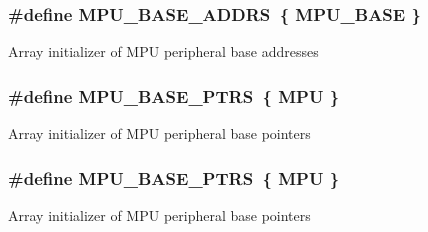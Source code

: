 \subsubsection[{\texorpdfstring{M\+P\+U\+\_\+\+B\+A\+S\+E\+\_\+\+A\+D\+D\+RS}{MPU_BASE_ADDRS}}]{\setlength{\rightskip}{0pt plus 5cm}\#define M\+P\+U\+\_\+\+B\+A\+S\+E\+\_\+\+A\+D\+D\+RS~\{ {\bf M\+P\+U\+\_\+\+B\+A\+SE} \}}\hypertarget{group__MPU__Peripheral__Access__Layer_ga05c682e671650e23a7103fb69e46ce86}{}\label{group__MPU__Peripheral__Access__Layer_ga05c682e671650e23a7103fb69e46ce86}
Array initializer of M\+PU peripheral base addresses 
\subsubsection[{\texorpdfstring{M\+P\+U\+\_\+\+B\+A\+S\+E\+\_\+\+P\+T\+RS}{MPU_BASE_PTRS}}]{\setlength{\rightskip}{0pt plus 5cm}\#define M\+P\+U\+\_\+\+B\+A\+S\+E\+\_\+\+P\+T\+RS~\{ {\bf M\+PU} \}}\hypertarget{group__MPU__Peripheral__Access__Layer_ga78460c4504e0b1effc8715d3fdb92f25}{}\label{group__MPU__Peripheral__Access__Layer_ga78460c4504e0b1effc8715d3fdb92f25}
Array initializer of M\+PU peripheral base pointers 
\subsubsection[{\texorpdfstring{M\+P\+U\+\_\+\+B\+A\+S\+E\+\_\+\+P\+T\+RS}{MPU_BASE_PTRS}}]{\setlength{\rightskip}{0pt plus 5cm}\#define M\+P\+U\+\_\+\+B\+A\+S\+E\+\_\+\+P\+T\+RS~\{ {\bf M\+PU} \}}\hypertarget{group__MPU__Peripheral__Access__Layer_ga78460c4504e0b1effc8715d3fdb92f25}{}\label{group__MPU__Peripheral__Access__Layer_ga78460c4504e0b1effc8715d3fdb92f25}
Array initializer of M\+PU peripheral base pointers 